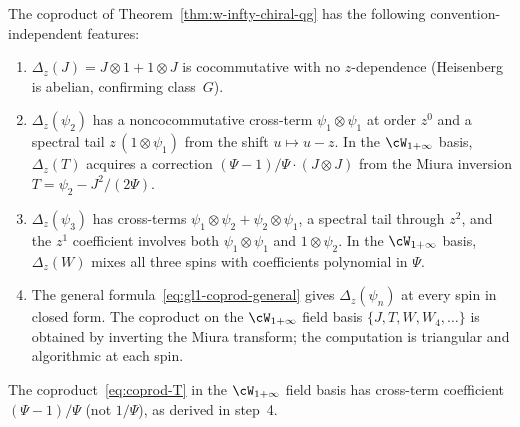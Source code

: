 \begin{remark}
\label{rem:w-infty-coprod-structure}
The coproduct of
Theorem~\textup{\ref{thm:w-infty-chiral-qg}}
has the following convention-independent features:
\begin{enumerate}[label=\textup{(\arabic*)}]
\item $\Delta_z(J) = J \otimes 1
 + 1 \otimes J$ is cocommutative with no
 $z$-dependence (Heisenberg is abelian,
 confirming class~$G$).
\item $\Delta_z(\psi_2)$ has a noncocommutative
 cross-term $\psi_1 \otimes \psi_1$ at order
 $z^0$ and a spectral tail
 $z\,(1 \otimes \psi_1)$ from the shift
 $u \mapsto u - z$.
 In the $\cW_{1+\infty}$ basis,
 $\Delta_z(T)$ acquires a correction
 $(\Psi - 1)/\Psi \cdot (J \otimes J)$ from the
 Miura inversion $T = \psi_2 - J^2/(2\Psi)$.
\item $\Delta_z(\psi_3)$ has cross-terms
 $\psi_1 \otimes \psi_2 + \psi_2 \otimes \psi_1$,
 a spectral tail through $z^2$, and the $z^1$
 coefficient involves both $\psi_1 \otimes \psi_1$
 and $1 \otimes \psi_2$. In the $\cW_{1+\infty}$
 basis, $\Delta_z(W)$ mixes all three spins with
 coefficients polynomial in $\Psi$.
\item The general formula~\eqref{eq:gl1-coprod-general}
 gives $\Delta_z(\psi_n)$ at every spin in closed form.
 The coproduct on the $\cW_{1+\infty}$ field basis
 $\{J, T, W, W_4, \ldots\}$ is obtained by
 inverting the Miura transform; the computation is
 triangular and algorithmic at each spin.
\end{enumerate}
\end{remark}

\begin{remark}
\label{rem:spin2-ceff-miura-w1infty}
The coproduct~\eqref{eq:coprod-T} in the
$\cW_{1+\infty}$ field basis has cross-term coefficient
$(\Psi - 1)/\Psi$ (not $1/\Psi$), as derived in step~4.
\end{remark}



